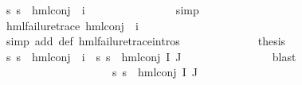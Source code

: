 \begin{isabellebody}
\ {\isachardoublequoteopen}{\isasymforall}s{\isachardot}{\kern0pt}\ {\isasymnot}{\isacharparenleft}{\kern0pt}s\ {\isasymTurnstile}\ hml{\isacharunderscore}{\kern0pt}conj\ {\isacharbraceleft}{\kern0pt}{\isacharbraceright}{\kern0pt}\ {\isacharbraceleft}{\kern0pt}i{\isacharunderscore}{\kern0pt}{\isasymphi}{\isacharbraceright}{\kern0pt}\ {\isasymPsi}{\isacharparenright}{\kern0pt}{\isachardoublequoteclose}\ \isanewline
\ \ \ \ \ \ \ \ \ \ \ \ \isamarkupfalse%
\ simp\isanewline
\ \ \ \ \ \ \ \ \ \ \isamarkupfalse%
\ {\isachardoublequoteopen}hml{\isacharunderscore}{\kern0pt}failure{\isacharunderscore}{\kern0pt}trace\ {\isacharparenleft}{\kern0pt}hml{\isacharunderscore}{\kern0pt}conj\ {\isacharbraceleft}{\kern0pt}{\isacharbraceright}{\kern0pt}\ {\isacharbraceleft}{\kern0pt}i{\isacharunderscore}{\kern0pt}{\isasymphi}{\isacharbraceright}{\kern0pt}\ {\isasymPsi}{\isacharparenright}{\kern0pt}{\isachardoublequoteclose}\ \isanewline
\ \ \ \ \ \ \ \ \ \ \ \ \isamarkupfalse%
\ {\isacharparenleft}{\kern0pt}simp\ add{\isacharcolon}{\kern0pt}\ {\isasymPsi}{\isacharunderscore}{\kern0pt}def\ hml{\isacharunderscore}{\kern0pt}failure{\isacharunderscore}{\kern0pt}trace{\isachardot}{\kern0pt}intros{\isacharparenleft}{\kern0pt}{}{\isacharparenright}{\kern0pt}{\isacharparenright}{\kern0pt}\isanewline
\ \ \ \ \ \ \ \ \ \ \isamarkupfalse%
\ \isamarkupfalse%
\ {\isacharquery}{\kern0pt}thesis\ \isamarkupfalse%
\ {\isacartoucheopen}{\isasymforall}s{\isachardot}{\kern0pt}\ {\isasymnot}{\isacharparenleft}{\kern0pt}s\ {\isasymTurnstile}\ hml{\isacharunderscore}{\kern0pt}conj\ {\isacharbraceleft}{\kern0pt}{\isacharbraceright}{\kern0pt}\ {\isacharbraceleft}{\kern0pt}i{\isacharunderscore}{\kern0pt}{\isasymphi}{\isacharbraceright}{\kern0pt}\ {\isasymPsi}{\isacharparenright}{\kern0pt}{\isacartoucheclose}\ {\isacartoucheopen}{\isasymforall}s{\isachardot}{\kern0pt}\ {\isasymnot}{\isacharparenleft}{\kern0pt}s\ {\isasymTurnstile}\ hml{\isacharunderscore}{\kern0pt}conj\ I\ J\ {\isasymPhi}{\isacharparenright}{\kern0pt}{\isacartoucheclose}\ \isanewline
\ \ \ \ \ \ \ \ \ \ \ \ \isamarkupfalse%
\ blast\isanewline
\ \ \ \ \ \ \ \ \isamarkupfalse%
\isanewline
\ \ \ \ \ \ \isamarkupfalse%
\isanewline
\ \ \ \ \ \ \ \ \isamarkupfalse%
\ {}\isanewline
\ \ \ \ \ \ \ \ \isamarkupfalse%
\ {\isachardoublequoteopen}{\isasymforall}s{\isachardot}{\kern0pt}\ {\isasymnot}s\ {\isasymTurnstile}\ {\isacharparenleft}{\kern0pt}hml{\isacharunderscore}{\kern0pt}conj\ I\ J\ {\isasymPhi}{\isacharparenright}{\kern0pt}{\isachardoublequoteclose}\ \isanewline

\end{isabellebody}
